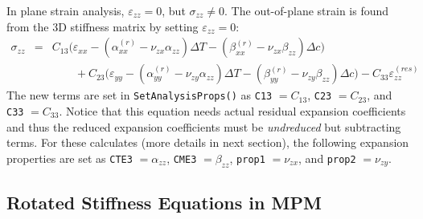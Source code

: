 \documentclass[11pt]{article}
\def\a#1{\alpha_{#1}}
\def\b#1{\beta_{#1}}
\def\code#1{{\small\tt #1}}
\def\DT{\Delta T}
\def\e#1{\varepsilon_{#1}}
\def\er#1{\varepsilon_{#1}^{(res)}}
\def\s#1{\sigma_{#1}}
\def\v#1{\nu_{#1}}
\begin{document}
In plane strain analysis, $\e{zz}=0$, but $\s{zz}\ne0$. The out-of-plane strain is found from the 3D stiffness matrix by setting $\e{zz}=0$:
\begin{eqnarray}
            \s{zz} & = & C_{13}\bigl(\e{xx} -(\a{xx}^{(r)}-\v{zx}\a{zz})\DT - (\b{xx}^{(r)}-\v{zx}\b{zz})\Delta c\bigr)
 \nonumber\\
 &&\qquad\mbox{}
                     +C_{23}\bigl(\e{yy} -(\a{yy}^{(r)}-\v{zy}\a{zz})\DT-(\b{yy}^{(r)}-\v{zy}\b{zz})\Delta c\bigr) 
                     -C_{33} \er{zz}
\end{eqnarray}
The new terms are set in \code{SetAnalysisProps()} as \code{C13} $=C_{13}$, \code{C23} $=C_{23}$, and \code{C33} $=C_{33}$. Notice that this equation needs actual residual expansion coefficients and thus the reduced expansion coefficients must be {\em undreduced} but subtracting terms. For these calculates (more details in next section), the following expansion properties are set as \code{CTE3} $=\a{zz}$, \code{CME3} $=\b{zz}$, \code{prop1} $=\v{zx}$, and \code{prop2} $=\v{zy}$.

\subsection{Rotated Stiffness Equations in MPM}
\end{document}
